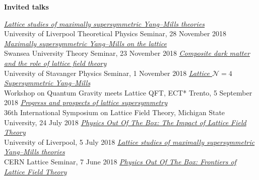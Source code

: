 \renewenvironment{spacelistout} {
  \begin{list} {} {
    \setlength{\topsep}{-8 pt}
    \setlength{\itemsep}{5 pt}
    \setlength{\leftmargin}{-1.15 in}
  }
}{
  \end{list}
}

\raggedright
\vspace{12 pt}
\begin{spacelistout}
  \item {\large \bfseries Invited talks}
  \begin{revnumerate}
  \setlength{\topsep}{-8 pt}
  \setlength{\itemsep}{10 pt}
  \setlength{\leftmargin}{0 mm}
    \pagebreakitem
      \textit{\href{http://www.davidschaich.net/talks/1811Liverpool.pdf}{Lattice studies of maximally supersymmetric Yang--Mills theories}} \\
      University of Liverpool Theoretical Physics Seminar, 28 November 2018
    \pagebreakitem
      \textit{\href{http://www.davidschaich.net/talks/1811Swansea.pdf}{Maximally supersymmetric Yang--Mills on the lattice}} \\
      Swansea University Theory Seminar, 23 November 2018
    \pagebreakitem
      \textit{\href{http://www.davidschaich.net/talks/1811Stavanger.pdf}{Composite dark matter and the role of lattice field theory}} \\
      University of Stavanger Physics Seminar, 1 November 2018
    \pagebreakitem
      \textit{\href{http://www.davidschaich.net/talks/1809ECT.pdf}{Lattice $\mathcal N = 4$ Supersymmetric Yang--Mills}} \\
      Workshop on Quantum Gravity meets Lattice QFT, ECT* Trento, 5 September 2018
    \pagebreakitem
      \textit{\href{http://www.davidschaich.net/talks/1807Lattice.pdf}{Progress and prospects of lattice supersymmetry}} \\
      36th International Symposium on Lattice Field Theory, Michigan State University, 24 July 2018
    \pagebreakitem
      \textit{\href{http://www.davidschaich.net/talks/1807Liverpool.pdf}{Physics Out Of The Box: The Impact of Lattice Field Theory}} \\
      University of Liverpool, 5 July 2018
    \pagebreakitem
      \textit{\href{http://www.davidschaich.net/talks/1806CERN.pdf}{Lattice studies of maximally supersymmetric Yang--Mills theories}} \\
      CERN Lattice Seminar, 7 June 2018
    \pagebreakitem
      \textit{\href{http://www.davidschaich.net/talks/1803FIU.pdf}{Physics Out Of The Box: Frontiers of Lattice Field Theory}} \\

\end{revnumerate}
\end{spacelistout}
